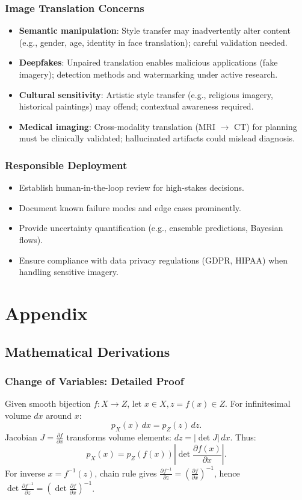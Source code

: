 \documentclass[11pt]{article}
\begin{document}
\subsubsection{Image Translation Concerns}
\begin{itemize}
\item \textbf{Semantic manipulation}: Style transfer may inadvertently alter content (e.g., gender, age, identity in face translation); careful validation needed.
\item \textbf{Deepfakes}: Unpaired translation enables malicious applications (fake imagery); detection methods and watermarking under active research.
\item \textbf{Cultural sensitivity}: Artistic style transfer (e.g., religious imagery, historical paintings) may offend; contextual awareness required.
\item \textbf{Medical imaging}: Cross-modality translation (MRI $\to$ CT) for planning must be clinically validated; hallucinated artifacts could mislead diagnosis.
\end{itemize}

\subsubsection{Responsible Deployment}
\begin{itemize}
\item Establish human-in-the-loop review for high-stakes decisions.
\item Document known failure modes and edge cases prominently.
\item Provide uncertainty quantification (e.g., ensemble predictions, Bayesian flows).
\item Ensure compliance with data privacy regulations (GDPR, HIPAA) when handling sensitive imagery.
\end{itemize}

\section{Appendix}
\subsection{Mathematical Derivations}
\subsubsection{Change of Variables: Detailed Proof}
Given smooth bijection $f: X \to Z$, let $x \in X, z = f(x) \in Z$. For infinitesimal volume $dx$ around $x$:
\begin{equation}
p_X(x) \, dx = p_Z(z) \, dz.
\end{equation}
Jacobian $J = \frac{\partial f}{\partial x}$ transforms volume elements: $dz = |\det J| \, dx$. Thus:
\begin{equation}
p_X(x) = p_Z(f(x)) \left| \det \frac{\partial f(x)}{\partial x} \right|.
\end{equation}
For inverse $x = f^{-1}(z)$, chain rule gives $\frac{\partial f^{-1}}{\partial z} = \left(\frac{\partial f}{\partial x}\right)^{-1}$, hence $\det \frac{\partial f^{-1}}{\partial z} = \left(\det \frac{\partial f}{\partial x}\right)^{-1}$.
\end{document}

